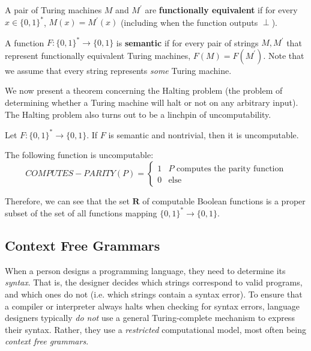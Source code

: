 \documentclass{article}
\begin{document}
  \begin{definition}
  A pair of Turing machines $M$ and $M^\prime$ are \textbf{functionally equivalent} if for every $x \in \{0,1\}^*$, $M(x) = M^\prime (x)$ (including when the function outputs $\perp$). 

  A function $F: \{0,1\}^* \longrightarrow \{0,1\}$ is \textbf{semantic} if for every pair of strings $M, M^\prime$ that represent functionally equivalent Turing machines, $F(M) = F(M^\prime)$. Note that we assume that every string represents \textit{some} Turing machine. 
  \end{definition}

  We now present a theorem concerning the Halting problem (the problem of determining whether a Turing machine will halt or not on any arbitrary input). The Halting problem also turns out to be a linchpin of uncomputability. 

  \begin{theorem}
  Let $F: \{0,1\}^* \longrightarrow \{0,1\}$. If $F$ is semantic and nontrivial, then it is uncomputable. 
  \end{theorem}

  \begin{corollary}
  The following function is uncomputable: 
  \[COMPUTES-PARITY(P) = \begin{cases}1 & P \text{ computes the parity function} \\
  0 & \text{else}
  \end{cases}\]
  \end{corollary}

  Therefore, we can see that the set $\mathbf{R}$ of computable Boolean functions is a proper subset of the set of all functions mapping $\{0, 1\}^* \longrightarrow \{0, 1\}$. 

  \subsection{Context Free Grammars}
  When a person designs a programming language, they need to determine its \textit{syntax}. That is, the designer decides which strings correspond to valid programs, and which ones do not (i.e. which strings contain a syntax error). To ensure that a compiler or interpreter always halts when checking for syntax errors, language designers typically \textit{do not} use a general Turing-complete mechanism to express their syntax. Rather, they use a \textit{restricted} computational model, most often being \textit{context free grammars}. 
\end{document}
